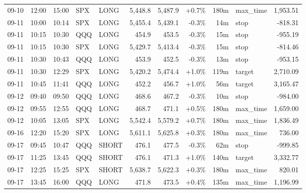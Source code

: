 \documentclass[11pt,a4paper,twoside]{article}
\begin{document}
\begin{center}
\begin{longtable}{>{\color{txtmain}}l l l l l r r r r >{\color{txtmain}}l r}
09-10 & 12:00 & 15:00 & SPX & LONG & 5,448.8 & 5,487.9 & \textcolor{wingreen}{+0.7\%} & 180m & max\_time & \textcolor{wingreen}{1,953.51} \\
09-11 & 10:00 & 10:14 & SPX & LONG & 5,455.4 & 5,439.1 & \textcolor{lossred}{-0.3\%} & 14m & stop & \textcolor{lossred}{-818.31} \\
09-11 & 10:15 & 10:30 & QQQ & LONG & 454.9 & 453.5 & \textcolor{lossred}{-0.3\%} & 15m & stop & \textcolor{lossred}{-955.19} \\
09-11 & 10:15 & 10:30 & SPX & LONG & 5,429.7 & 5,413.4 & \textcolor{lossred}{-0.3\%} & 15m & stop & \textcolor{lossred}{-814.46} \\
09-11 & 10:30 & 10:43 & QQQ & LONG & 453.9 & 452.5 & \textcolor{lossred}{-0.3\%} & 13m & stop & \textcolor{lossred}{-953.15} \\
09-11 & 10:30 & 12:29 & SPX & LONG & 5,420.2 & 5,474.4 & \textcolor{wingreen}{+1.0\%} & 119m & target & \textcolor{wingreen}{2,710.09} \\
09-11 & 10:45 & 11:41 & QQQ & LONG & 452.2 & 456.7 & \textcolor{wingreen}{+1.0\%} & 56m & target & \textcolor{wingreen}{3,165.47} \\
09-12 & 09:40 & 09:50 & QQQ & LONG & 468.6 & 467.2 & \textcolor{lossred}{-0.3\%} & 10m & stop & \textcolor{lossred}{-984.00} \\
09-12 & 09:55 & 12:55 & QQQ & LONG & 468.7 & 471.1 & \textcolor{wingreen}{+0.5\%} & 180m & max\_time & \textcolor{wingreen}{1,659.00} \\
09-12 & 10:05 & 13:05 & SPX & LONG & 5,542.4 & 5,579.2 & \textcolor{wingreen}{+0.7\%} & 180m & max\_time & \textcolor{wingreen}{1,836.49} \\
09-16 & 12:20 & 15:20 & SPX & LONG & 5,611.1 & 5,625.8 & \textcolor{wingreen}{+0.3\%} & 180m & max\_time & \textcolor{wingreen}{736.00} \\
09-17 & 09:45 & 10:47 & QQQ & SHORT & 476.1 & 477.5 & \textcolor{lossred}{-0.3\%} & 62m & stop & \textcolor{lossred}{-999.85} \\
09-17 & 11:25 & 13:45 & QQQ & SHORT & 476.1 & 471.3 & \textcolor{wingreen}{+1.0\%} & 140m & target & \textcolor{wingreen}{3,332.77} \\
09-17 & 12:25 & 15:25 & SPX & SHORT & 5,638.7 & 5,622.3 & \textcolor{wingreen}{+0.3\%} & 180m & max\_time & \textcolor{wingreen}{820.01} \\
09-17 & 13:45 & 16:00 & QQQ & LONG & 471.8 & 473.5 & \textcolor{wingreen}{+0.4\%} & 135m & max\_time & \textcolor{wingreen}{1,196.99} \\

\end{longtable}
\end{center}
\end{document}
